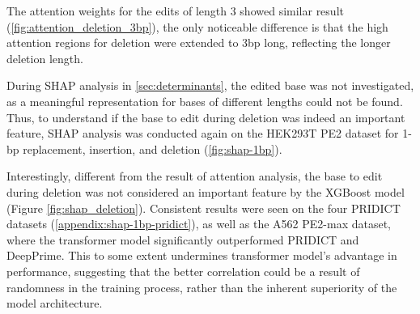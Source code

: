 The attention weights for the edits of length 3 showed similar result (\autoref{fig:attention_deletion_3bp}), the only noticeable difference is that the high attention regions for deletion were extended to 3bp long, reflecting the longer deletion length.

During SHAP analysis in \autoref{sec:determinants}, the edited base was not investigated, as a meaningful representation for bases of different lengths could not be found. Thus, to understand if the base to edit during deletion was indeed an important feature, SHAP analysis was conducted again on the HEK293T PE2 dataset for 1-bp replacement, insertion, and deletion (\autoref{fig:shap-1bp}).

Interestingly, different from the result of attention analysis, the base to edit during deletion was not considered an important feature by the XGBoost model (Figure \ref{fig:shap_deletion}). Consistent results were seen on the four PRIDICT datasets (\autoref{appendix:shap-1bp-pridict}), as well as the A562 PE2-max dataset, where the transformer model significantly outperformed PRIDICT and DeepPrime. This to some extent undermines transformer model's advantage in performance, suggesting that the better correlation could be a result of randomness in the training process, rather than the inherent superiority of the model architecture.